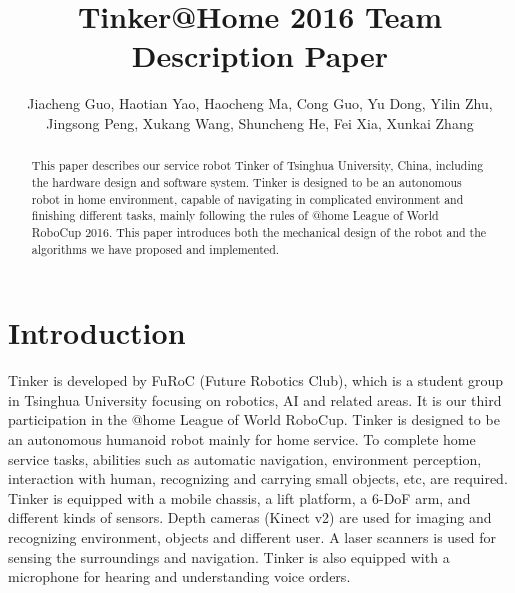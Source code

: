 \documentclass[runningheads,a4paper]{llncs}
\begin{document}
	
\title{Tinker@Home 2016 Team Description Paper}
\author{Jiacheng Guo, Haotian Yao, Haocheng Ma, Cong Guo, Yu Dong, Yilin Zhu, Jingsong Peng, Xukang Wang, Shuncheng He, Fei Xia, Xunkai Zhang}
\maketitle


\begin{abstract}
This paper describes our service robot Tinker of Tsinghua University, China, including the hardware design and software system. Tinker is designed to be an autonomous robot in home environment, capable of navigating in complicated environment and finishing different tasks, mainly following the rules of @home League of World RoboCup 2016. This paper introduces both the mechanical design of the robot and the algorithms we have proposed and implemented.
\end{abstract}



\section{Introduction}
Tinker is developed by FuRoC (Future Robotics Club), which is a student group in Tsinghua University focusing on robotics, AI and related areas. It is our third participation in the @home League of World RoboCup. Tinker is designed to be an autonomous humanoid robot mainly for home service. To complete home service tasks, abilities such as automatic navigation, environment perception, interaction with human, recognizing and carrying small objects, etc, are required. Tinker is equipped with a mobile chassis, a lift platform, a 6-DoF arm, and different kinds of sensors. Depth cameras (Kinect v2) are used for imaging and recognizing environment, objects and different user. A laser scanners is used for sensing the surroundings and navigation. Tinker is also equipped with a microphone for hearing and understanding voice orders.
\end{document}
